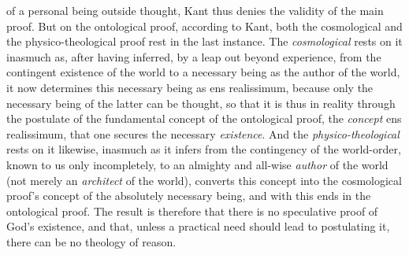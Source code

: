 of a personal being outside thought, Kant thus denies the validity of the
main proof. But on the ontological proof, according to Kant, both the
cosmological and the physico-theological proof rest in the last instance.
The \emph{cosmological} rests on it inasmuch as, after having inferred,
by a leap out beyond experience, from the contingent existence of the
world to a necessary being as the author of the world, it now determines
this necessary being as ens realissimum, because only the necessary being
of the latter can be thought, so that it is thus in reality through the
postulate of the fundamental concept of the ontological proof, the
\emph{concept} ens realissimum, that one secures the necessary
\emph{existence}. And the \emph{physico-theological} rests on it
likewise, inasmuch as it infers from the contingency of the world-order,
known to us only incompletely, to an almighty and all-wise
\emph{author} of the world (not merely an \emph{architect} of the
world), converts this concept into the cosmological proof's concept of
the absolutely necessary being, and with this ends in the ontological
proof. The result is therefore that there is no speculative proof of
God's existence, and that, unless a practical need should lead to
postulating it, there can be no theology of reason.

